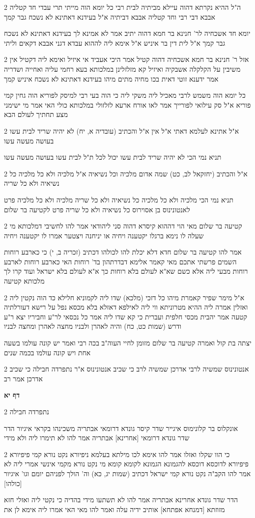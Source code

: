 \documentclass[12pt, openany]{book}
\newcommand{\sethebfont}{
\fontsize{10.5pt}{21.0pt} \selectfont
}
\newcommand{\twocol}[1]{
	{\sethebfont \begin{multicols}{2}
			#1
	\end{multicols}}	
}
\newcommand{\sectname}{}
\newcommand{\newsection}[1]{
	\addcontentsline{toc}{section}{#1}
	\renewcommand{\sectname}{#1}	
	\vspace{-\baselineskip}
	\begin{center}
		\textbf{%
\fontsize{16pt}{16pt}\selectfont
			#1}
	\end{center}
	\vspace{-\baselineskip}
	\nopagebreak
}
\begin{document}
\twocol{ה"ל ההיא נקרתא דהוה עיילא מביתיה לבית רבי כל יומא הוה מייתי תרי עבדי חד קטליה אבבא דבי רבי וחד קטליה אבבא דביתיה א"ל בעידנא דאתינא לא נשכח גבר קמך
\par יומא חד אשכחיה לר' חנינא בר חמא דהוה יתיב אמר לא אמינא לך בעידנא דאתינא לא נשכח גבר קמך א"ל לית דין בר איניש א"ל אימא ליה לההוא עבדא דגני אבבא דקאים וליתי}
\twocol{אזל ר' חנינא בר חמא אשכחיה דהוה קטיל אמר היכי אעביד אי איזיל ואימא ליה דקטיל אין משיבין על הקלקלה אשבקיה ואיזיל קא מזלזלינן במלכותא בעא רחמי עליה ואחייה ושדריה אמר ידענא זוטי דאית בכו מחיה מתים מיהו בעידנא דאתינא לא נשכח איניש קמך
\par כל יומא הוה משמש לרבי מאכיל ליה משקי ליה כי הוה בעי רבי למיסק לפוריא הוה גחין קמי פוריא א"ל סק עילואי לפורייך אמר לאו אורח ארעא לזלזולי במלכותא כולי האי אמר מי ישימני מצע תחתיך לעולם הבא}
\twocol{א"ל אתינא לעלמא דאתי א"ל אין א"ל והכתיב (עובדיה א, יח) לא יהיה שריד לבית עשו בעושה מעשה עשו
\par תניא נמי הכי לא יהיה שריד לבית עשו יכול לכל ת"ל לבית עשו בעושה מעשה עשו}
\twocol{א"ל והכתיב (יחזקאל לב, כט) שמה אדום מלכיה וכל נשיאיה א"ל מלכיה ולא כל מלכיה כל נשיאיה ולא כל שריה
\par תניא נמי הכי מלכיה ולא כל מלכיה כל נשיאיה ולא כל שריה מלכיה ולא כל מלכיה פרט לאנטונינוס בן אסוירוס כל נשיאיה ולא כל שריה פרט לקטיעה בר שלום}
\twocol{קטיעה בר שלום מאי הוי דההוא קיסרא דהוה סני ליהודאי אמר להו לחשיבי דמלכותא מי שעלה לו נימא ברגלו יקטענה ויחיה או יניחנה ויצטער אמרו לו יקטענה ויחיה
\par אמר להו קטיעה בר שלום חדא דלא יכלת להו לכולהו דכתיב (זכריה ב, י) כי כארבע רוחות השמים פרשתי אתכם מאי קאמר אלימא דבדרתהון בד' רוחות האי כארבע רוחות לארבע רוחות מבעי ליה אלא כשם שא"א לעולם בלא רוחות כך א"א לעולם בלא ישראל ועוד קרו לך מלכותא קטיעה}
\twocol{א"ל מימר שפיר קאמרת מיהו כל דזכי (מלכא) שדו ליה לקמוניא חלילא כד הוה נקטין ליה ואזלין אמרה ליה ההיא מטרוניתא ווי ליה לאילפא דאזלא בלא מכסא נפל על רישא דעורלתיה קטעה אמר יהבית מכסי חלפית ועברית כי קא שדו ליה אמר כל נכסאי לר"ע וחביריו יצא ר"ע ודרש (שמות כט, כח) והיה לאהרן ולבניו מחצה לאהרן ומחצה לבניו
\par יצתה בת קול ואמרה קטיעה בר שלום מזומן לחיי העוה"ב בכה רבי ואמר יש קונה עולמו בשעה אחת ויש קונה עולמו בכמה שנים}
\twocol{אנטונינוס שמשיה לרבי אדרכן שמשיה לרב כי שכיב אנטונינוס א"ר נתפרדה חבילה כי שכיב אדרכן אמר רב}
\newsection{דף יא}
\twocol{נתפרדה חבילה
\par אונקלוס בר קלונימוס איגייר שדר קיסר גונדא דרומאי אבתריה משכינהו בקראי איגיור הדר שדר גונדא דרומאי [אחרינא] אבתריה אמר להו לא תימרו ליה ולא מידי}
\twocol{כי הוו שקלו ואזלו אמר להו אימא לכו מילתא בעלמא ניפיורא נקט נורא קמי פיפיורא פיפיורא לדוכסא דוכסא להגמונא הגמונא לקומא קומא מי נקט נורא מקמי אינשי אמרי ליה לא אמר להו הקב"ה נקט נורא קמי ישראל דכתיב (שמות יג, כא) וה' הולך לפניהם יומם וגו' איגיור [כולהו]
\par הדר שדר גונדא אחרינא אבתריה אמר להו לא תשתעו מידי בהדיה כי נקטי ליה ואזלי חזא מזוזתא [דמנחא אפתחא] אותיב ידיה עלה ואמר להו מאי האי אמרו ליה אימא לן את}
\end{document}
